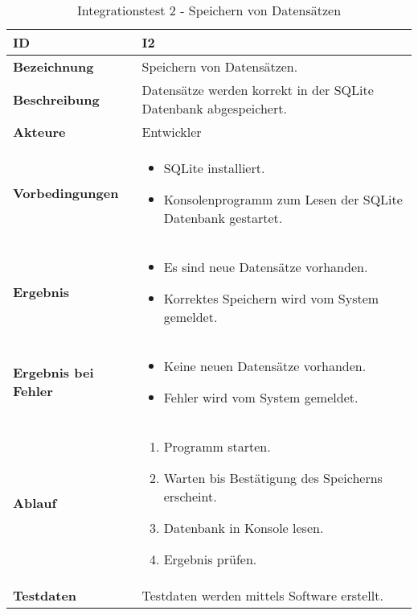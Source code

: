 \begin{table}[H]
    \begin{tabularx}{\textwidth}{ | p{} | p{} |} \hline
        \rowcolor{gray!50}
        \textbf{ID} & \textbf{I2}\\ \hline
        \textbf{Bezeichnung} & 
        Speichern von Datensätzen.\\ \hline
        \textbf{Beschreibung} & 
        Datensätze werden korrekt in der SQLite Datenbank abgespeichert.\\ \hline
        \textbf{Akteure} &
        Entwickler\\ \hline
        \textbf{Vorbedingungen} &
        \begin{itemize}
            \item SQLite installiert.
            \item Konsolenprogramm zum Lesen der SQLite Datenbank gestartet.
        \end{itemize}\\ \hline
        \textbf{Ergebnis} &        
        \begin{itemize}
            \item Es sind neue Datensätze vorhanden.
            \item Korrektes Speichern wird vom System gemeldet.
        \end{itemize}\\ \hline
        \textbf{Ergebnis bei Fehler} &
        \begin{itemize}
            \item Keine neuen Datensätze vorhanden.
            \item Fehler wird vom System gemeldet.
        \end{itemize}\\ \hline
        \textbf{Ablauf} &
        \begin{enumerate}
            \item Programm starten.
            \item Warten bis Bestätigung des Speicherns erscheint.
            \item Datenbank in Konsole lesen.
            \item Ergebnis prüfen.
        \end{enumerate}\\ \hline
        \textbf{Testdaten} &
        Testdaten werden mittels Software erstellt.\\ \hline
    \end{tabularx}
    \caption{Integrationstest 2 - Speichern von Datensätzen}
    \label{tab:inttest2}
\end{table}

